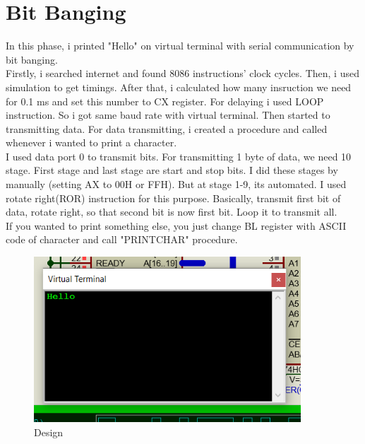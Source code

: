 \documentclass[11pt]{article}
\begin{document}
\section{Bit Banging}
In this phase, i printed "Hello" on virtual terminal with serial communication by bit banging. \\Firstly, i searched internet and found 8086 instructions' clock cycles. Then, i used simulation to get timings. After that, i calculated how many insruction we need for 0.1 ms and set this number to CX register. For delaying i used LOOP instruction. So i got same baud rate with virtual terminal. Then started to transmitting data. For data transmitting, i created a procedure and called whenever i wanted to print a character.
\\I used data port 0 to transmit bits. For transmitting 1 byte of data, we need 10 stage. First stage and last stage are start and stop bits. I did these stages by manually (setting AX to 00H or FFH). But at stage 1-9, its automated. I used rotate right(ROR) instruction for this purpose. Basically, transmit first bit of data, rotate right, so that second bit is now first bit. Loop it to transmit all.
\\If you wanted to print something else, you just change BL register with ASCII code of character and call "PRINTCHAR" procedure.
\begin{figure}[h!]
	\centering
	\includegraphics[width=10cm]{Terminal1.png}
	\caption{Design}
	\label{fig:Terminal output with bit banging}
\end{figure}
\end{document}
